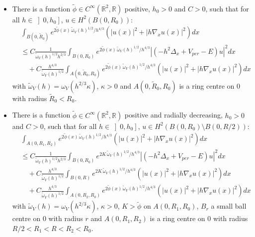 \documentclass[10pt,a4paper]{amsart}
\newcommand{\nn}{\nonumber}
\begin{document}
\begin{cor}
\label{cor: cor2}
\hfill\\
\begin{itemize}
\item There is a function $\tilde{\phi} \in C^\infty(\mathbb{R}^2,\mathbb{R})$ positive, $h_0 >0 $ and $C>0$, such that for all $ h\in \left]0, h_0 \right]$, $u \in H^2(B(0,R_0))$:
\begin{align}
    &\int_{B(0,\tilde{R}_0)} e^{2\tilde{\phi}(x)\,\tilde{\omega}_V(h)^{1/2}/ h^{4/3}} (|u(x)|^2 +|h\nabla_x u(x)|^2)dx\nn\\
    &\leq C \frac{1}{\tilde{\omega}_V(h)^{1/2}h^{2/3}}\int_{B(0,R_0)} e^{2\tilde{\phi}(x)\,\tilde{\omega}_V(h)^{1/2}/ h^{4/3}}|(-h^2\Delta_x + V_{per}- E)u|^2dx\nn\\
    &\quad +C \frac{h^{4/3}}{\tilde{\omega}_V(h)^{1/2}}\int_{A(0,\tilde{R}_0,R_0)} e^{2\tilde{\phi}(x)\,\tilde{\omega}_V(h)^{1/2}/ h^{4/3}} (|u(x)|^2 +|h\nabla_x u(x)|^2)dx
\end{align}
with $\tilde{\omega}_V(h)=\omega_V( h^{2/3}\kappa)$, $\kappa>0$ and $A(0,\tilde{R}_0,R_0)$ is a ring centre on $0$ with radius $\tilde{R}_0<R_0$.
 
\item There is a function $\tilde{\phi} \in C^\infty(\mathbb{R}^2,\mathbb{R})$ positive and radially decreasing, $h_0 >0 $ and $C>0$, such that for all $ h\in \left]0, h_0 \right]$, $u \in H^2(B(0,R_0)\setminus B(0,R/2))$:
\begin{align}
    &\int_{A(0,R_1,R_2)} e^{2\tilde{\phi}(x)\,\tilde{\omega}_V(h)^{1/2}/ h^{4/3}} (|u(x)|^2 +|h\nabla_x u(x)|^2)dx\nn\\
    &\leq C \frac{1}{\tilde{\omega}_V(h)^{1/2}h^{2/3}}\int_{B(0,R_0)} e^{2K\,\tilde{\omega}_V(h)^{1/2}/ h^{4/3}}|(-h^2\Delta_x + V_{per}- E)u|^2dx\nn\\
    &\quad + C \frac{h^{4/3}}{\tilde{\omega}_V(h)^{1/2}}\int_{B(0,R)} e^{2K\,\tilde{\omega}_V(h)^{1/2}/ h^{4/3}} (|u(x)|^2 +|h\nabla_x u(x)|^2)dx\nn\\
    &\quad +C \frac{h^{4/3}}{\tilde{\omega}_V(h)^{1/2}}\int_{A(0,R_2,R_0)} e^{2\tilde{\phi}(x)\,\tilde{\omega}_V(h)^{1/2}/ h^{4/3}} (|u(x)|^2 +|h\nabla_x u(x)|^2)dx
\end{align}
with $\tilde{\omega}_V(h)=\omega_V( h^{2/3}\kappa)$, $\kappa>0$, $K>\tilde{\phi}$ on $A(0,R_1,R_0)$, $B_r$ a small ball centre on $0$ with radius $r$ and $A(0,R_1,R_2)$ is a ring centre on $0$ with radius $R/2<R_1<R<R_2<R_0$.
\end{itemize}
\end{cor}
\end{document}
